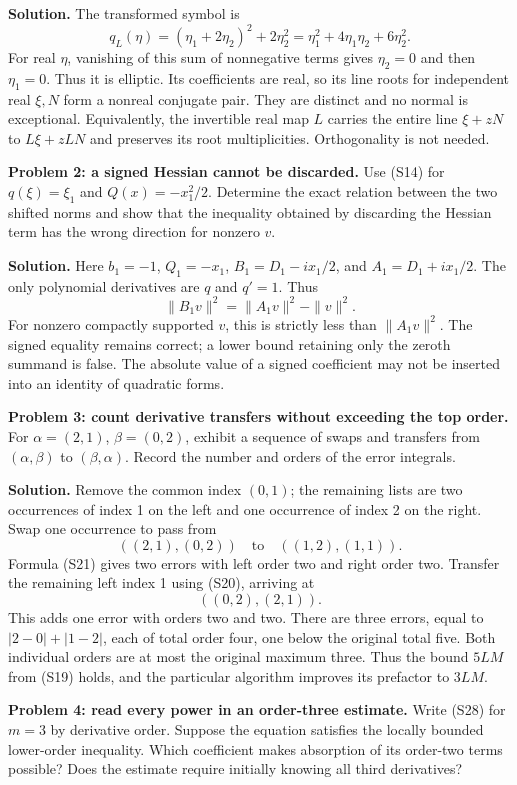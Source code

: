 \documentclass[
  11pt,
]{article}
\begin{document}
\textbf{Solution.} The transformed symbol is \[
 q_L(\eta)=(\eta_1+2\eta_2)^2+2\eta_2^2
          =\eta_1^2+4\eta_1\eta_2+6\eta_2^2.
\] For real \(\eta\), vanishing of this sum of nonnegative terms gives
\(\eta_2=0\) and then \(\eta_1=0\). Thus it is elliptic. Its
coefficients are real, so its line roots for independent real \(\xi,N\)
form a nonreal conjugate pair. They are distinct and no normal is
exceptional. Equivalently, the invertible real map \(L\) carries the
entire line \(\xi+zN\) to \(L\xi+zLN\) and preserves its root
multiplicities. Orthogonality is not needed.

\textbf{Problem 2: a signed Hessian cannot be discarded.} Use (S14) for
\(q(\xi)=\xi_1\) and \(Q(x)=-x_1^2/2\). Determine the exact relation
between the two shifted norms and show that the inequality obtained by
discarding the Hessian term has the wrong direction for nonzero \(v\).

\textbf{Solution.} Here \(b_1=-1\), \(Q_1=-x_1\), \(B_1=D_1-ix_1/2\),
and \(A_1=D_1+ix_1/2\). The only polynomial derivatives are \(q\) and
\(q'=1\). Thus \[
                 \|B_1v\|^2=\|A_1v\|^2-\|v\|^2.
\] For nonzero compactly supported \(v\), this is strictly less than
\(\|A_1v\|^2\). The signed equality remains correct; a lower bound
retaining only the zeroth summand is false. The absolute value of a
signed coefficient may not be inserted into an identity of quadratic
forms.

\textbf{Problem 3: count derivative transfers without exceeding the top
order.} For \(\alpha=(2,1)\), \(\beta=(0,2)\), exhibit a sequence of
swaps and transfers from \((\alpha,\beta)\) to \((\beta,\alpha)\).
Record the number and orders of the error integrals.

\textbf{Solution.} Remove the common index \((0,1)\); the remaining
lists are two occurrences of index 1 on the left and one occurrence of
index 2 on the right. Swap one occurrence to pass from \[
 ((2,1),(0,2))\quad\text{to}\quad((1,2),(1,1)).
\] Formula (S21) gives two errors with left order two and right order
two. Transfer the remaining left index 1 using (S20), arriving at \[
 ((0,2),(2,1)).
\] This adds one error with orders two and two. There are three errors,
equal to \(|2-0|+|1-2|\), each of total order four, one below the
original total five. Both individual orders are at most the original
maximum three. Thus the bound \(5LM\) from (S19) holds, and the
particular algorithm improves its prefactor to \(3LM\).

\textbf{Problem 4: read every power in an order-three estimate.} Write
(S28) for \(m=3\) by derivative order. Suppose the equation satisfies
the locally bounded lower-order inequality. Which coefficient makes
absorption of its order-two terms possible? Does the estimate require
initially knowing all third derivatives?
\end{document}
